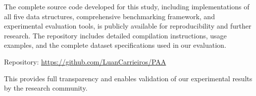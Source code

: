 \documentclass{sbc2023}
\begin{document}
The complete source code developed for this study, including implementations of all five data structures, comprehensive benchmarking framework, and experimental evaluation tools, is publicly available for reproducibility and further research. The repository includes detailed compilation instructions, usage examples, and the complete dataset specifications used in our evaluation.

Repository: \url{https://github.com/LuanCarrieiros/PAA}

This provides full transparency and enables validation of our experimental results by the research community.

\nocite{*} %
\printbibliography[title={References}] %
\end{document}
